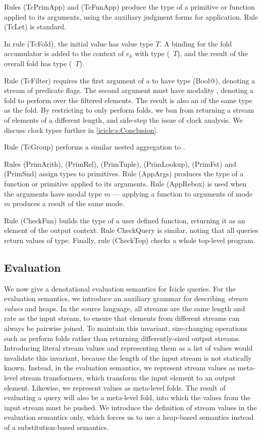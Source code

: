 Rules (TcPrimApp) and (TcFunApp) produce the type of a primitive or function applied to its arguments, using the auxiliary judgment forms for application.
Rule (TcLet) is standard.

In rule (TcFold), the initial value has value type $T$.
A binding for the fold accumulator is added to the context of $e_k$ with type (\Ic@Element@~$T$), and the result of the overall fold has type (\Ic@Aggregate@~$T$).

Rule (TcFilter) requires the first argument of a \Ic@filter@ to have type (\Ic@Element Bool@), denoting a stream of predicate flags.
The second argument must have modality \Ic@Aggregate@, denoting a fold to perform over the filtered elements.
The result is also an \Ic@Aggregate@ of the same type as the fold.
By restricting \Ic@filter@ to only perform folds, we ban \Ic@filter@ from returning a stream of elements of a different length, and side-step the issue of clock analysis.
We discuss clock types further in \cref{icicle:s:Conclusion}.

Rule (TcGroup) performs a similar nested aggregation to \Ic@filter@.

Rules (PrimArith), (PrimRel), (PrimTuple), (PrimLookup), (PrimFst) and (PrimSnd) assign types to primitives.
Rule (AppArgs) produces the type of a function or primitive applied to its arguments.
Rule (AppRebox) is used when the arguments have modal type $m$ --- applying a function to arguments of mode $m$ produces a result of the same mode.

Rule (CheckFun) builds the type of a user defined function, returning it as an element of the output context. Rule CheckQuery is similar, noting that all queries return values of \Ic@Aggregate@ type. Finally, rule (CheckTop) checks a whole top-level program.


\subsection{Evaluation}

We now give a denotational evaluation semantics for Icicle queries.
For the evaluation semantics, we introduce an auxiliary grammar for describing \emph{stream values} and heaps.
In the source language, all streams are the same length and rate as the input stream, to ensure that elements from different streams can always be pairwise joined.
To maintain this invariant, size-changing operations such as \Ic@filter@ perform folds rather than returning differently-sized output streams.
Introducing literal stream values and representing them as a list of values would invalidate this invariant, because the length of the input stream is not statically known.
Instead, in the evaluation semantics, we represent \Ic@Element@ stream values as meta-level stream transformers, which transform the input element to an output element.
Likewise, we represent \Ic@Aggregate@ values as meta-level folds.
The result of evaluating a query will also be a meta-level fold, into which the values from the input stream must be pushed.
We introduce the definition of stream values in the evaluation semantics only, which forces us to use a heap-based semantics instead of a substitution-based semantics.

